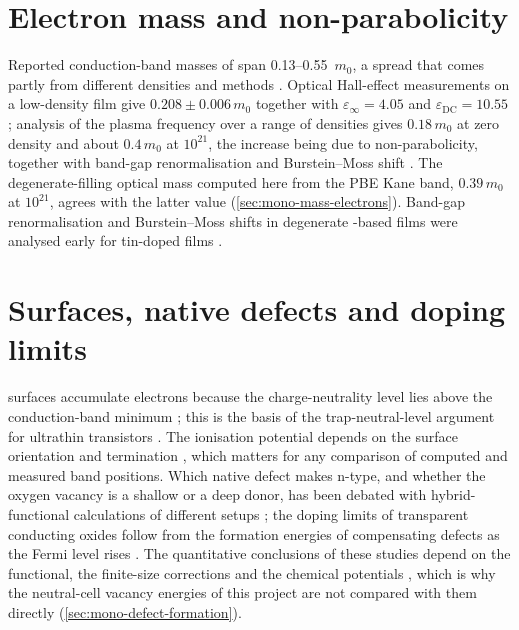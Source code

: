 \section{Electron mass and non-parabolicity}
\label{sec:mono-lit-mass}

Reported conduction-band masses of \InO{} span 0.13--0.55~$m_0$, a spread that comes partly from different densities
and methods \citep[p.~225102-2]{Stokey2021}. Optical Hall-effect measurements on a low-density film give
$0.208\pm0.006\,m_0$ together with $\varepsilon_\infty = 4.05$ and $\varepsilon_{\mathrm{DC}} = 10.55$
\citep[p.~225102-1]{Stokey2021}; analysis of the plasma frequency over a range of densities gives $0.18\,m_0$ at zero
density and about $0.4\,m_0$ at $10^{21}$\cmcu{}, the increase being due to non-parabolicity, together with band-gap
renormalisation and Burstein--Moss shift \citep{Feneberg2016,Burstein1954,Moss1954}. The degenerate-filling optical mass
computed here from the PBE Kane band, $0.39\,m_0$ at $10^{21}$\cmcu{}, agrees with the latter value
(\cref{sec:mono-mass-electrons}). Band-gap renormalisation and Burstein--Moss shifts in degenerate \InO{}-based films
were analysed early for tin-doped films \citep{Hamberg1986}.

\section{Surfaces, native defects and doping limits}
\label{sec:mono-lit-defects}

\InO{} surfaces accumulate electrons because the charge-neutrality level lies above the conduction-band minimum
\citep{King2008}; this is the basis of the trap-neutral-level argument for ultrathin \InO{} transistors
\citep[p.~504]{Si2021}. The ionisation potential depends on the surface orientation and termination
\citep{Hohmann2011}, which matters for any comparison of computed and measured band positions. Which native defect makes
\InO{} n-type, and whether the oxygen vacancy is a shallow or a deep donor, has been debated with hybrid-functional
calculations of different setups \citep{Agoston2009,Buckeridge2018,Chatratin2019}; the doping limits of transparent
conducting oxides follow from the formation energies of compensating defects as the Fermi level rises \citep{Lany2007}.
The quantitative conclusions of these studies depend on the functional, the finite-size corrections and the chemical
potentials \citep{Freysoldt2014,Lany2008}, which is why the neutral-cell vacancy energies of this project are not
compared with them directly (\cref{sec:mono-defect-formation}).


